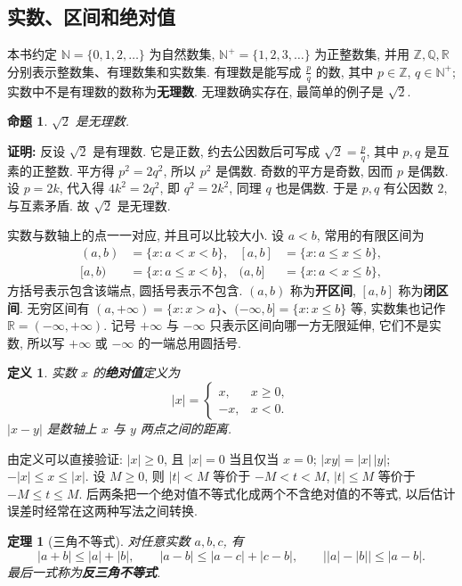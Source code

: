 \documentclass[UTF8,openany]{ctexbook}
\theoremstyle{chinesetextbook}
\newtheorem{definition}{定义}[section]
\newtheorem{theorem}{定理}[section]
\newenvironment{cnproof}{\par\indent\textbf{证明:} \ignorespaces}{\par}
\newtheorem*{propositionsingle}{命题}
\begin{document}
\subsection{实数、区间和绝对值}
本书约定 $\mathbb N=\{0,1,2,\ldots\}$ 为自然数集, $\mathbb N^+=\{1,2,3,\ldots\}$ 为正整数集, 并用 $\mathbb Z,\mathbb Q,\mathbb R$ 分别表示整数集、有理数集和实数集. 有理数是能写成 $\displaystyle\frac pq$ 的数, 其中 $p\in\mathbb Z$, $q\in\mathbb N^+$; 实数中不是有理数的数称为\textbf{无理数}. 无理数确实存在, 最简单的例子是 $\sqrt2$.
\begin{propositionsingle}
$\sqrt2$ 是无理数.
\end{propositionsingle}
\begin{cnproof}
反设 $\sqrt2$ 是有理数. 它是正数, 约去公因数后可写成 $\displaystyle\sqrt2=\frac pq$, 其中 $p,q$ 是互素的正整数. 平方得 $p^2=2q^2$, 所以 $p^2$ 是偶数. 奇数的平方是奇数, 因而 $p$ 是偶数. 设 $p=2k$, 代入得 $4k^2=2q^2$, 即 $q^2=2k^2$, 同理 $q$ 也是偶数. 于是 $p,q$ 有公因数 $2$, 与互素矛盾. 故 $\sqrt2$ 是无理数.
\end{cnproof}
实数与数轴上的点一一对应, 并且可以比较大小. 设 $a<b$, 常用的有限区间为
\[
\begin{aligned}
(a,b)&=\{x:a<x<b\},& [a,b]&=\{x:a\le x\le b\},\\
[a,b)&=\{x:a\le x<b\},& (a,b]&=\{x:a<x\le b\},
\end{aligned}
\]
方括号表示包含该端点, 圆括号表示不包含. $(a,b)$ 称为\textbf{开区间}, $[a,b]$ 称为\textbf{闭区间}. 无穷区间有 $(a,+\infty)=\{x:x>a\}$、$(-\infty,b]=\{x:x\le b\}$ 等, 实数集也记作 $\mathbb R=(-\infty,+\infty)$. 记号 $+\infty$ 与 $-\infty$ 只表示区间向哪一方无限延伸, 它们不是实数, 所以写 $+\infty$ 或 $-\infty$ 的一端总用圆括号.
\begin{definition}
实数 $x$ 的\textbf{绝对值}定义为
\[
|x|=\begin{cases}x,&x\ge0,\\-x,&x<0.\end{cases}
\]
$|x-y|$ 是数轴上 $x$ 与 $y$ 两点之间的距离.
\end{definition}
由定义可以直接验证: $|x|\ge0$, 且 $|x|=0$ 当且仅当 $x=0$; $|xy|=|x|\,|y|$; $-|x|\le x\le|x|$. 设 $M\ge0$, 则 $|t|<M$ 等价于 $-M<t<M$, $|t|\le M$ 等价于 $-M\le t\le M$. 后两条把一个绝对值不等式化成两个不含绝对值的不等式, 以后估计误差时经常在这两种写法之间转换.
\begin{theorem}[三角不等式]
对任意实数 $a,b,c$, 有
\[
|a+b|\le|a|+|b|,\qquad |a-b|\le|a-c|+|c-b|,\qquad \bigl||a|-|b|\bigr|\le|a-b|.
\]
最后一式称为\textbf{反三角不等式}.
\end{theorem}
\end{document}
